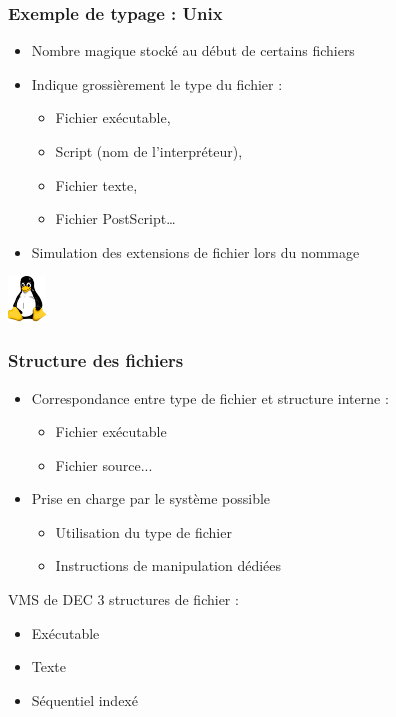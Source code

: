 \begin{frame}
\frametitle{Exemple de typage : \textbf{Unix}}
\begin{itemize}
\item Nombre magique stocké au début de certains fichiers
\item Indique grossièrement le type du fichier :
\begin{itemize}
\item Fichier exécutable,
\item Script (nom de l'interpréteur),
\item Fichier texte,
\item Fichier PostScript…
\end{itemize}
\item Simulation des extensions de fichier lors du nommage
\end{itemize}
\includegraphics[width=1cm]{../illustration/logo_tux.png}
\end{frame}

\begin{frame}
\frametitle{Structure des fichiers}
\begin{itemize}
\item Correspondance entre type de fichier et structure interne :
\begin{itemize}
\item Fichier exécutable
\item Fichier source...
\end{itemize}
\item Prise en charge par le système possible
\begin{itemize}
\item Utilisation du type de fichier
\item Instructions de manipulation dédiées
\end{itemize}
\end{itemize}
\begin{exampleblock}{VMS de DEC}
3 structures de fichier :
\begin{itemize}
\item Exécutable
\item Texte
\item Séquentiel indexé
\end{itemize}
\end{exampleblock}
\end{frame}

